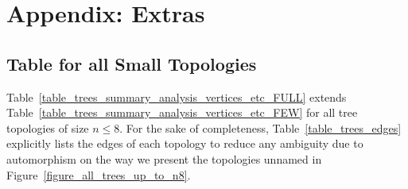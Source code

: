\section{Appendix: Extras}
\label{section_appendix_extras}

\subsection{Table for all Small Topologies}

Table~\ref{table_trees_summary_analysis_vertices_etc_FULL} extends Table~\ref{table_trees_summary_analysis_vertices_etc_FEW} for all tree topologies of size $n \le 8$. For the sake of completeness, Table~\ref{table_trees_edges} explicitly lists the edges of each topology to reduce any ambiguity due to automorphism on the way we present the topologies unnamed in Figure~\ref{figure_all_trees_up_to_n8}.


